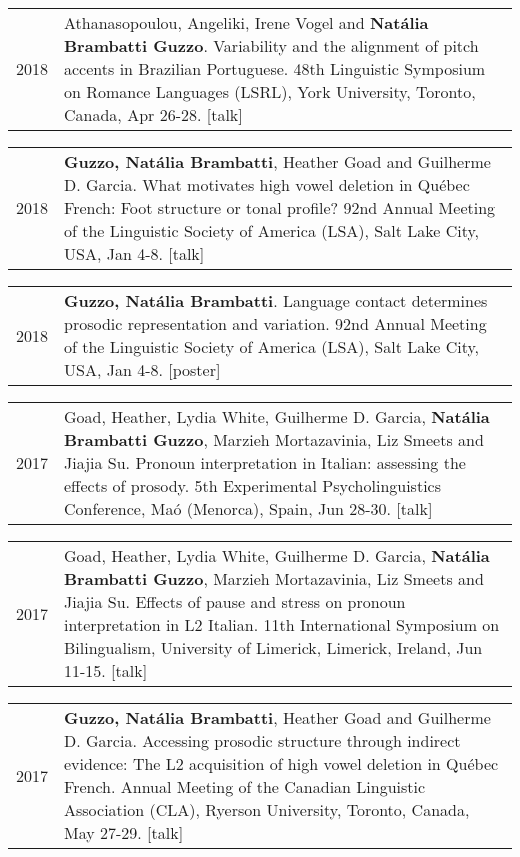 \documentclass[letterpaper,10pt]{article}
\begin{document}
\begin{tabular}{p{1cm}p{16cm}}
2018 & Athanasopoulou, Angeliki, Irene Vogel and \textbf{Nat\'alia Brambatti Guzzo}. Variability and the alignment of pitch accents in Brazilian Portuguese. 48th Linguistic Symposium on Romance Languages (LSRL), York University, Toronto, Canada, Apr 26-28. [talk]
\end{tabular}

\begin{tabular}{p{1cm}p{16cm}}
2018 & \textbf{Guzzo, Nat\'alia Brambatti}, Heather Goad and Guilherme D. Garcia. What motivates high vowel deletion in Qu\'ebec French: Foot structure or tonal profile? 92nd Annual Meeting of the Linguistic Society of America (LSA), Salt Lake City, USA, Jan 4-8. [talk]
\end{tabular}


\begin{tabular}{p{1cm}p{16cm}}
2018 & \textbf{Guzzo, Nat\'alia Brambatti}. Language contact determines prosodic representation and variation. 92nd Annual Meeting of the Linguistic Society of America (LSA), Salt Lake City, USA, Jan 4-8. [poster]
\end{tabular}


\begin{tabular}{p{1cm}p{16cm}}
2017 & Goad, Heather, Lydia White, Guilherme D. Garcia, \textbf{Nat\'alia Brambatti Guzzo}, Marzieh Mortazavinia, Liz Smeets and Jiajia Su. Pronoun interpretation in Italian: assessing the effects of prosody. 5th Experimental Psycholinguistics Conference, Ma\'o (Menorca), Spain, Jun 28-30. [talk]
\end{tabular}


\begin{tabular}{p{1cm}p{16cm}}
2017 & Goad, Heather, Lydia White, Guilherme D. Garcia, \textbf{Nat\'alia Brambatti Guzzo}, Marzieh Mortazavinia, Liz Smeets and Jiajia Su. Effects of pause and stress on pronoun interpretation in L2 Italian. 11th International Symposium on Bilingualism, University of Limerick, Limerick, Ireland, Jun 11-15. [talk]
\end{tabular}


\begin{tabular}{p{1cm}p{16cm}}
2017 & \textbf{Guzzo, Nat\'alia Brambatti}, Heather Goad and Guilherme D. Garcia. Accessing prosodic structure through indirect evidence: The L2 acquisition of high vowel deletion in Qu\'ebec French. Annual Meeting of the Canadian Linguistic Association (CLA), Ryerson University, Toronto, Canada, May 27-29. [talk]
\end{tabular}
\end{document}
